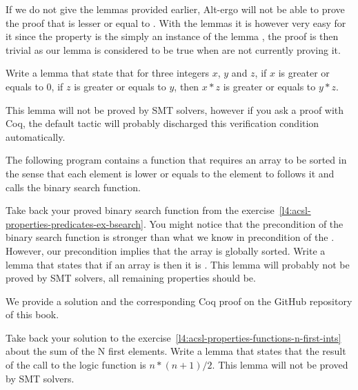 


If we do not give the lemmas provided earlier, Alt-ergo will not be able
to prove the proof that  is lesser or equal to
. With the lemmas it is however very easy for it since the
property is the simply an instance of the lemma
, the proof is then trivial as our lemma is
considered to be true when are not currently proving it.








Write a lemma that state that for three integers $x$, $y$ and $z$, if $x$ is
greater or equals to $0$, if $z$ is greater or equals to $y$, then $x * z$ is
greater or equals to $y * z$.


This lemma will not be proved by SMT solvers, however if you ask a proof with
Coq, the default tactic will probably discharged this verification condition
automatically.




The following program contains a function that requires an array to be sorted
in the sense that each element is lower or equals to the element to follows it
and calls the binary search function.




Take back your proved binary search function from the
exercise~\ref{l4:acsl-properties-predicates-ex-bsearch}. You might notice that
the precondition of the binary search function is stronger than what we know in
precondition of the . However, our precondition
implies that the array is globally sorted. Write a lemma that states that if
an array is  then it is .
This lemma will probably not be proved by SMT solvers, all remaining properties
should be.

We provide a solution and the corresponding Coq proof on the GitHub repository
of this book.




Take back your solution to the
exercise~\ref{l4:acsl-properties-functions-n-first-ints} about the sum of the
N first elements. Write a lemma that states that the result of the call to the
logic function is $n*(n+1)/2$. This lemma will not be proved by SMT solvers.


